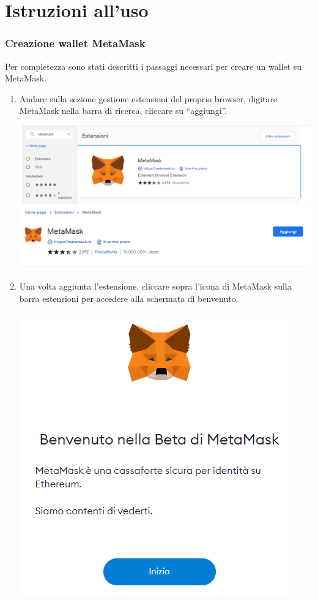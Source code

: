 \section{Istruzioni all'uso}
\subsubsection{Creazione wallet MetaMask}
Per completezza sono stati descritti i passaggi necessari per creare un wallet su MetaMask.

\begin{enumerate}
    \item Andare sulla sezione gestione estensioni del proprio browser, digitare MetaMask nella barra di ricerca, cliccare su “aggiungi”.
    
   
    \includegraphics[scale = 0.4]{img/Estensione1.PNG}\\
    \includegraphics[scale = 0.4]{img/Estensione2.PNG}
    \item Una volta aggiunta l’estensione, cliccare sopra l’icona di MetaMask sulla barra estensioni per accedere alla schermata di benvenuto.\\
     \begin{center}
        \includegraphics[scale = 0.4]{img/MetaMask1.PNG}

\end{center}
\end{enumerate}
